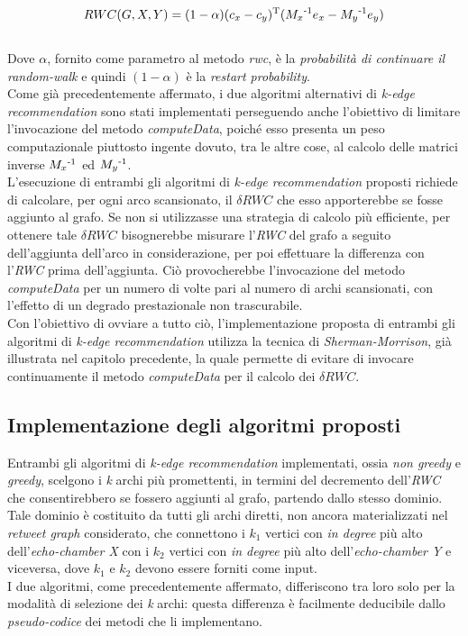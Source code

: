 \\
\begin{equation}
RWC(G,X,Y) = (1 - \alpha)(c_x - c_y)\textsuperscript{T}(M_x\textsuperscript{-1}e_x - M_y\textsuperscript{-1}e_y)
\end{equation}
\\
Dove $\alpha$, fornito come parametro al metodo \textit{rwc}, è la \textit{probabilità di continuare il random-walk} e quindi $(1-\alpha)$ è la \textit{restart probability}. 
\\Come già precedentemente affermato, i due algoritmi alternativi di \textit{k-edge recommendation} sono stati implementati perseguendo anche l'obiettivo di limitare l'invocazione del metodo \textit{computeData}, poiché esso presenta un peso computazionale piuttosto ingente dovuto, tra le altre cose, al calcolo delle matrici inverse  $M_x\textsuperscript{-1}$ ed $M_y\textsuperscript{-1}$. 
\\L'esecuzione di entrambi gli algoritmi di \textit{k-edge recommendation} proposti richiede di calcolare, per ogni arco scansionato, il \textit{$\delta RWC$} che esso apporterebbe se fosse aggiunto al grafo. Se non si utilizzasse una strategia di calcolo più efficiente, per ottenere tale \textit{$\delta RWC$} bisognerebbe misurare l'\textit{RWC} del grafo a seguito dell'aggiunta dell'arco in considerazione, per poi effettuare la differenza con l'\textit{RWC} prima dell'aggiunta. Ciò provocherebbe l'invocazione del metodo \textit{computeData} per un numero di volte pari al numero di archi scansionati, con l'effetto di un degrado prestazionale non trascurabile. \\Con l'obiettivo di ovviare a tutto ciò, l'implementazione proposta di entrambi gli algoritmi di \textit{k-edge recommendation} utilizza la tecnica di \textit{Sherman-Morrison}, già illustrata nel capitolo precedente, la quale permette di evitare di invocare continuamente il metodo \textit{computeData} per il calcolo dei \textit{$\delta RWC$}. 

\subsection{Implementazione degli algoritmi proposti}
Entrambi gli algoritmi di \textit{k-edge recommendation} implementati, ossia \textit{non greedy} e \textit{greedy}, scelgono i \textit{k} archi più promettenti, in termini del decremento dell'\textit{RWC} che consentirebbero se fossero aggiunti al grafo, partendo dallo stesso dominio. Tale dominio è costituito da tutti gli archi diretti, non ancora materializzati nel \textit{retweet graph} considerato, che connettono i \textit{$k_1$} vertici con \textit{in degree} più alto dell'\textit{echo-chamber X} con i \textit{$k_2$} vertici con \textit{in degree} più alto dell'\textit{echo-chamber Y} e viceversa, dove \textit{$k_1$} e \textit{$k_2$} devono essere forniti come input. 
\\I due algoritmi, come precedentemente affermato, differiscono tra loro solo per la modalità di selezione dei \textit{k} archi: questa differenza è facilmente deducibile dallo \textit{pseudo-codice} dei metodi che li implementano.


